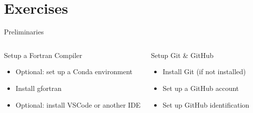 \section{Exercises}

\begin{frame}{Preliminaries}
	\begin{columns}[T]
		\begin{block}{Setup a Fortran Compiler}
			\begin{itemize}
				\item Optional: set up a Conda environment
				\item Install gfortran
				\item Optional: install VSCode or another IDE
			\end{itemize}
		\end{block}		
		\begin{block}{Setup Git \& GitHub}
			\begin{itemize}
				\item Install Git (if not installed)
				\item Set up a GitHub account
				\item Set up GitHub identification
			\end{itemize}
		\end{block}		
	\end{columns}
\end{frame}



